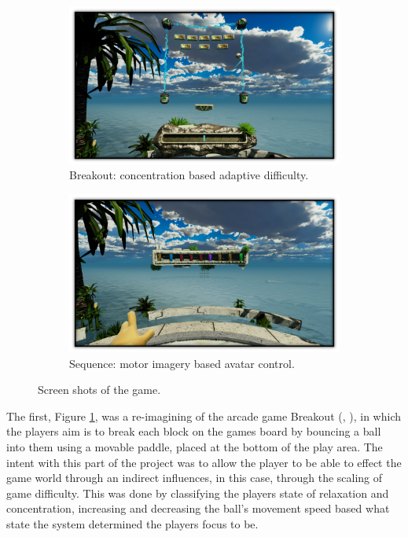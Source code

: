 \documentclass[11pt, a4paper]{article}
\newcommand{\ccite}[1]{(\citeauthor{#1}, \citeyear{#1})}
\newcommand{\reffigure}[1]{Figure \ref{#1}}
\begin{document}
\begin{figure}[H]
	\centering
	\begin{subfigure}[t]{0.45\linewidth}
		\includegraphics[width = \linewidth] {[ Figures ]/Breakout Mini-Game.png}
		\captionsetup{font = small, labelfont = small, width=.8\linewidth}
		\caption{Breakout: concentration based adaptive difficulty.}
		\label{fig:the_game_1}
	\end{subfigure}
	\begin{subfigure}[t]{0.45\linewidth}
		\includegraphics[width = \linewidth] {[ Figures ]/Sequence Mini-Game.png}
		\captionsetup{font = small, labelfont = small, width=.8\linewidth}
		\caption{Sequence: motor imagery based avatar control.}
		\label{fig:the_game_2}
	\end{subfigure}
	\captionsetup{font = small, labelfont = small, width=.8\linewidth}
	\caption{Screen shots of the game.}
	\label{fig:the_game}
\end{figure}

\pagebreak

The first, \reffigure{fig:the_game_1}, was a re-imagining of the arcade game Breakout \ccite{breakout}, in which the players aim is to break each block on the games board by bouncing a ball into them using a movable paddle, placed at the bottom of the play area. The intent with this part of the project was to allow the player to be able to effect the game world through an indirect influences, in this case, through the scaling of game difficulty. This was done by classifying the players state of relaxation and concentration, increasing and decreasing the ball's movement speed based what state the system determined the players focus to be.
\end{document}
